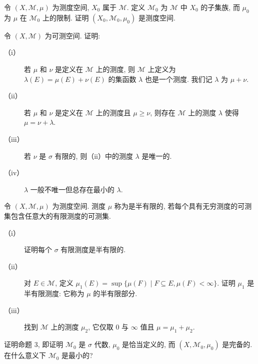 \documentclass[../../main.tex]{subfiles}
\begin{document}
\begin{exercise}\label{exercise:ch17-06}
令 $(X,\mathcal{M},\mu)$ 为测度空间, $X_{0}$ 属于 $\mathcal{M}$. 定义 $\mathcal{M}_{0}$ 为 $\mathcal{M}$ 中 $X_{0}$ 的子集族, 而 $\mu_{0}$ 为 $\mu$ 在 $\mathcal{M}_{0}$ 上的限制. 证明 $(X_{0},\mathcal{M}_{0},\mu_{0})$ 是测度空间.
\end{exercise}

\begin{exercise}\label{exercise:ch17-07}
令 $(X,\mathcal{M})$ 为可测空间. 证明:
\begin{description}
\item[（i）] 若 $\mu$ 和 $\nu$ 是定义在 $\mathcal{M}$ 上的测度, 则 $\mathcal{M}$ 上定义为 $\lambda(E)=\mu(E)+\nu(E)$ 的集函数 $\lambda$ 也是一个测度. 我们记 $\lambda$ 为 $\mu+\nu$.
\item[（ii）] 若 $\mu$ 和 $\nu$ 是定义在 $\mathcal{M}$ 上的测度且 $\mu\geqslant\nu$, 则存在 $\mathcal{M}$ 上的测度 $\lambda$ 使得 $\mu=\nu+\lambda$.
\item[（iii）] 若 $\nu$ 是 $\sigma$ 有限的, 则（ii）中的测度 $\lambda$ 是唯一的.
\item[（iv）] $\lambda$ 一般不唯一但总存在最小的 $\lambda$.
\end{description}
\end{exercise}

\begin{exercise}\label{exercise:ch17-08}
令 $(X,\mathcal{M},\mu)$ 为测度空间. 测度 $\mu$ 称为是半有限的, 若每个具有无穷测度的可测集包含任意大的有限测度的可测集.
\begin{description}
\item[（i）] 证明每个 $\sigma$ 有限测度是半有限的.
\item[（ii）] 对 $E\in\mathcal{M}$, 定义 $\mu_{1}(E)=\sup\{\mu(F)\mid F\subseteq E,\mu(F)<\infty\}$. 证明 $\mu_{1}$ 是半有限测度: 它称为 $\mu$ 的半有限部分.
\item[（iii）] 找到 $\mathcal{M}$ 上的测度 $\mu_{2}$, 它仅取 $0$ 与 $\infty$ 值且 $\mu=\mu_{1}+\mu_{2}$.
\end{description}
\end{exercise}

\begin{exercise}\label{exercise:ch17-09}
证明命题 3, 即证明 $\mathcal{M}_{0}$ 是 $\sigma$ 代数, $\mu_{0}$ 是恰当定义的, 而 $(X,\mathcal{M}_{0},\mu_{0})$ 是完备的. 在什么意义下 $\mathcal{M}_{0}$ 是最小的?
\end{exercise}
\end{document}
